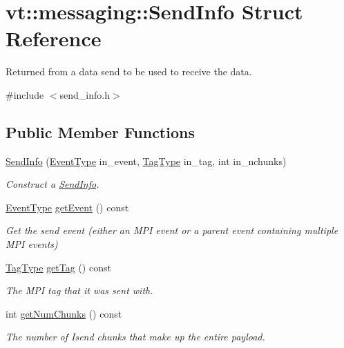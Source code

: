 \hypertarget{structvt_1_1messaging_1_1_send_info}{}\section{vt\+:\+:messaging\+:\+:Send\+Info Struct Reference}
\label{structvt_1_1messaging_1_1_send_info}


Returned from a data send to be used to receive the data.  




{\ttfamily \#include $<$send\+\_\+info.\+h$>$}

\subsection*{Public Member Functions}
\begin{DoxyCompactItemize}
\item 
\hyperlink{structvt_1_1messaging_1_1_send_info_a29c15fdc6ded2e3fcd64ad76957009bc}{Send\+Info} (\hyperlink{namespacevt_a009267401def7ae8bf201892222d060f}{Event\+Type} in\+\_\+event, \hyperlink{namespacevt_a84ab281dae04a52a4b243d6bf62d0e52}{Tag\+Type} in\+\_\+tag, int in\+\_\+nchunks)
\begin{DoxyCompactList}\small\item\em Construct a \hyperlink{structvt_1_1messaging_1_1_send_info}{Send\+Info}. \end{DoxyCompactList}\item 
\hyperlink{namespacevt_a009267401def7ae8bf201892222d060f}{Event\+Type} \hyperlink{structvt_1_1messaging_1_1_send_info_aaa9c6a91b1004c8e6f6140db3b7b8905}{get\+Event} () const
\begin{DoxyCompactList}\small\item\em Get the send event (either an M\+PI event or a parent event containing multiple M\+PI events) \end{DoxyCompactList}\item 
\hyperlink{namespacevt_a84ab281dae04a52a4b243d6bf62d0e52}{Tag\+Type} \hyperlink{structvt_1_1messaging_1_1_send_info_a2091dcc87c564afddebcfee8281aa464}{get\+Tag} () const
\begin{DoxyCompactList}\small\item\em The M\+PI tag that it was sent with. \end{DoxyCompactList}\item 
int \hyperlink{structvt_1_1messaging_1_1_send_info_aadc88909e3ca1a680815af1e15d60777}{get\+Num\+Chunks} () const
\begin{DoxyCompactList}\small\item\em The number of Isend chunks that make up the entire payload. \end{DoxyCompactList}\end{DoxyCompactItemize}
